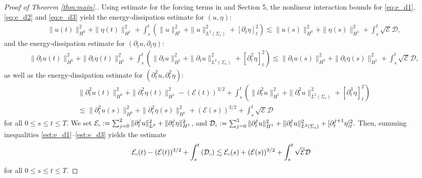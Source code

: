 \documentclass[letterpaper,reqno,10pt,twoside]{amsart}
\theoremstyle{definition}
\theoremstyle{remark}
\def\p{\partial}
\begin{document}
\begin{proof}[Proof of Theorem \ref{thm:main}.]
			Using estimate for the forcing terms in \cite{GT2020} and Section 5, the nonlinear interaction bounds for \eqref{eq:e_d1}, \eqref{eq:e_d2} and \eqref{eq:e_d3} yield the energy-dissipation estimate for $(u, \eta)$:
			\begin{equation}\label{est:e_d1}
				\begin{aligned}
					&\|u(t)\|_{H^0}^2+\|\eta(t)\|_{H^1}^2+\int_s^t(\|u\|_{H^1}^2+\|u\|_{L^2(\Sigma_s)}^2+[\p_t\eta]_\ell^2)\lesssim \|u(s)\|_{H^0}^2+\|\eta(s)\|_{H^1}^2+\int_s^t\sqrt{\mathcal{E}}\mathcal{D},
				\end{aligned}
			\end{equation}
			and the energy-dissipation estimate for $(\p_tu, \p_t\eta)$:
			\begin{equation}\label{est:e_d2}
				\begin{aligned}
					&\|\p_tu(t)\|_{H^0}^2+\|\p_t\eta(t)\|_{H^1}^2+\int_s^t(\|\p_tu\|_{H^1}^2+\|\p_tu\|_{L^2(\Sigma_s)}^2+[\p_t^2\eta]_\ell^2)\lesssim \|\p_tu(s)\|_{H^0}^2+\|\p_t\eta(s)\|_{H^1}^2+\int_s^t\sqrt{\mathcal{E}}\mathcal{D},
				\end{aligned}
			\end{equation}
			as well as the energy-dissipation estimate for $(\p_t^2u, \p_t^2\eta)$:
			\begin{equation}\label{est:e_d3}
				\begin{aligned}
					&\|\p_t^2u(t)\|_{H^0}^2+\|\p_t^2\eta(t)\|_{H^1}^2-(\mathcal{E}(t))^{3/2}+\int_s^t(\|\p_t^2u\|_{H^1}^2+\|\p_t^2u\|_{L^2(\Sigma_s)}^2+[\p_t^3\eta]_\ell^2)\\
					&\lesssim \|\p_t^2u(s)\|_{H^0}^2+\|\p_t^2\eta(s)\|_{H^1}^2+(\mathcal{E}(s))^{3/2}+\int_s^t\sqrt{\mathcal{E}}\mathcal{D}
				\end{aligned}
			\end{equation}
			for all $0\le s\le t\le T$.  We set
			$
			\mathcal{E}_\shortparallel:=\sum_{j=0}^2\|\p_t^ju\|_{L^2}^2+\|\p_t^j\eta\|_{H^1}^2$,
			and
			$
			\mathcal{D}_\shortparallel:=\sum_{j=0}^3\|\p_t^ju\|_{H^1}^2+\|\p_t^ju\|_{L^2(\Sigma_s)}^2+[\p_t^{j+1}\eta]_\ell^2.$
			Then, summing inequalities \eqref{est:e_d1}--\eqref{est:e_d3} yields the estimate
			\begin{equation}\label{est:energy_dissipation1}
				\mathcal{E}_\shortparallel(t)-(\mathcal{E}(t))^{3/2}+\int_s^t\left(\mathcal{D}_\shortparallel\right)\lesssim\mathcal{E}_\shortparallel(s)+(\mathcal{E}(s))^{3/2}+\int_s^t\sqrt{\mathcal{E}}\mathcal{D}
			\end{equation}
			for all $0\le s\le t\le T$.
			

\end{proof}
\end{document}
